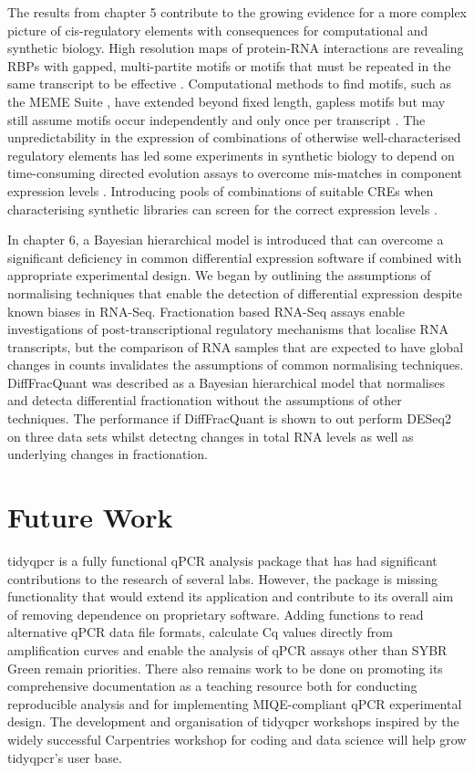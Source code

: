 \documentclass[../main.tex]{subfiles}
\begin{document}
The results from chapter 5 contribute to the growing evidence for a more complex picture of cis-regulatory elements with consequences for computational and synthetic biology.
High resolution maps of protein-RNA interactions are revealing RBPs with gapped, multi-partite motifs \parencite{Olivier2005} or motifs that must be repeated in the same transcript to be effective \parencite{Jackson2004, Gu2004}.
Computational methods to find motifs, such as the MEME Suite \parencite{Bailey2015}, have extended beyond fixed length, gapless motifs but may still assume motifs occur independently and only once per transcript \parencite{Frith2008}.
The unpredictability in the expression of combinations of otherwise well-characterised regulatory elements has led some experiments in synthetic biology to depend on time-consuming directed evolution assays to overcome mis-matches in component expression levels \parencite{Yokobayashi2002}.
Introducing pools of combinations of suitable CREs when characterising synthetic libraries can screen for the correct expression levels \parencite{Kosuri2013}.

In chapter 6, a Bayesian hierarchical model is introduced that can overcome a significant deficiency in common differential expression software if combined with appropriate experimental design. 
We began by outlining the assumptions of normalising techniques that enable the detection of differential expression despite known biases in RNA-Seq.
Fractionation based RNA-Seq assays enable investigations of post-transcriptional regulatory mechanisms that localise RNA transcripts, but the comparison of RNA samples that are expected to have global changes in counts invalidates the assumptions of common normalising techniques.
DiffFracQuant was described as a Bayesian hierarchical model that normalises and detecta differential fractionation without the assumptions of other techniques.
The performance if DiffFracQuant is shown to out perform DESeq2 on three data sets whilst detectng changes in total RNA levels as well as underlying changes in fractionation.

\section{Future Work}

tidyqpcr is a fully functional qPCR analysis package that has had significant contributions to the research of several labs. 
However, the package is missing functionality that would extend its application and contribute to its overall aim of removing dependence on proprietary software. 
Adding functions to read alternative qPCR data file formats, calculate Cq values directly from amplification curves and enable the analysis of qPCR assays other than SYBR Green remain priorities.
There also remains work to be done on promoting its comprehensive documentation as a teaching resource both for conducting reproducible analysis and for implementing MIQE-compliant qPCR experimental design.
The development and organisation of tidyqpcr workshops inspired by the widely successful Carpentries workshop for coding and data science will help grow tidyqpcr's user base.
\end{document}
